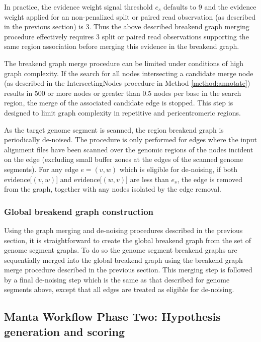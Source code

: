 \documentclass{article}
\begin{document}
In practice, the evidence weight signal threshold $e_s$ defaults to 9 and the evidence weight applied for an non-penalized split or paired read observation (as described in the previous section) is 3. Thus the above described breakend graph merging procedure effectively requires 3 split or paired read observations supporting the same region association before merging this evidence in the breakend graph.

The breakend graph merge procedure can be limited under conditions of high graph complexity. If the search for all nodes intersecting a candidate merge node (as described in the IntersectingNodes procedure in Method \ref{method:annotate}) results in 500 or more nodes or greater than 0.5 nodes per base in the search region, the merge of the associated candidate edge is stopped. This step is designed to limit graph complexity in repetitive and pericentromeric regions.

As the target genome segment is scanned, the region breakend graph is periodically de-noised. The procedure is only performed for edges where the input alignment files have been scanned over the genomic regions of the nodes incident on the edge (excluding small buffer zones at the edges of the scanned genome segments). For any edge $e = (v,w)$ which is eligible for de-noising, if both evidence[$(v,w)$] and evidence[$(w,v)$] are less than $e_s$, the edge is removed from the graph, together with any nodes isolated by the edge removal.

\subsubsection{Global breakend graph construction}

Using the graph merging and de-noising procedures described in the previous section, it is straightforward to create the global breakend graph from the set of genome segment graphs. To do so the genome segment breakend graphs are sequentially merged into the global breakend graph using the breakend graph merge procedure described in the previous section. This merging step is followed by a final de-noising step which is the same as that described for genome segments above, except that all edges are treated as eligible for de-noising.

\subsection{Manta Workflow Phase Two: Hypothesis generation and scoring}
\end{document}
